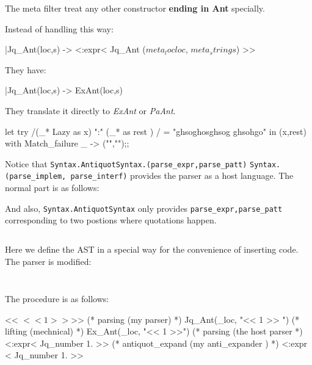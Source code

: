 The meta filter treat any other constructor \textbf{ending in Ant}
specially.


Instead of handling this way:

\begin{ocamlcode}
  |Jq_Ant(loc,s) -> <:expr< Jq_Ant ($meta_loc loc$, $meta_string s$) >>
\end{ocamlcode}


They have:

\begin{ocamlcode}
  |Jq_Ant(loc,s) -> ExAnt(loc,s) 
\end{ocamlcode}

They translate it directly to \textit{ExAnt} or \textit{PaAnt}.

\begin{ocamlcode}
let try /(_* Lazy as x) ":" (_* as rest ) / = "ghsoghosghsog ghsohgo"
in (x,rest)
with Match_failure _ -> ("","");;  
\end{ocamlcode}


Notice that 
\verb|Syntax.AntiquotSyntax.(parse_expr,parse_patt)|
\verb|Syntax.(parse_implem, parse_interf)|
provides the parser as a host language. The normal part is as follows:

And also, \verb|Syntax.AntiquotSyntax| only provides
\verb|parse_expr,parse_patt| corresponding to two postions where
quotations happen.


\inputminted[fontsize=\scriptsize, fontsize=\scriptsize, lastline=30]{ocaml}{camlp4/code/jake/json_ant.ml}


Here we define the AST in a special way for the convenience of
inserting code.  The parser is modified:
\inputminted[fontsize=\scriptsize, fontsize=\scriptsize, firstline=32,lastline=57]{ocaml}{camlp4/code/jake/json_ant.ml}

\inputminted[fontsize=\scriptsize, fontsize=\scriptsize, firstline=57,lastline=125]{ocaml}{camlp4/code/jake/json_ant.ml}




The procedure is as follows:

\begin{ocamlcode}
<< $ << 1 >> $>>  (* parsing (my parser) *)
Jq_Ant(_loc, "<< 1 >> ") (* lifting  (mechnical) *)
Ex_Ant(_loc, "<< 1 >>") (* parsing  (the host parser *)
<:expr< Jq_number 1. >>   (* antiquot_expand (my anti_expander ) *)
<:expr < Jq_number 1. >> 
\end{ocamlcode}





